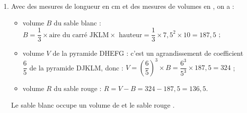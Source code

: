 \begin{enumerate}
\begin{enumerate}
            \item Avec des mesures de longueur en cm et des mesures de volumes en \ucmc{}, on a :
               \begin{itemize}
                  \item volume $B$ du sable blanc : $B =\dfrac13\times\text{aire du carré JKLM}\times\text{ hauteur} =\dfrac13\times7,5^2\times10 =187,5$ ;
                  \item volume $V$ de la pyramide DHEFG : c'est un agrandissement de coefficient $\dfrac65$ de la pyramide DJKLM, donc : $V =\left(\dfrac65\right)^3\times B =\dfrac{6^3}{5^3}\times187,5 =324$ ; \smallskip
                  \item volume $R$ du sable rouge : $R =V-B =324-187,5 =136,5$.
            \end{itemize}
            {\blue Le sable blanc occupe un volume de  et le sable rouge }.
      \end{enumerate}
   \end{enumerate}

